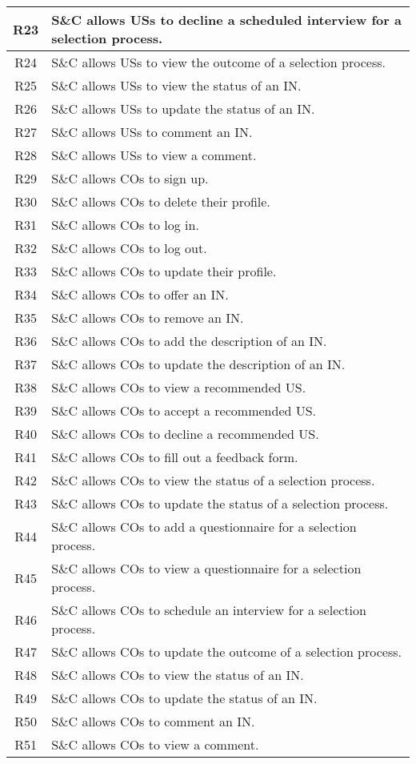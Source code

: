 \begin{longtable}{|c|p{10.5cm}|}
    R23 & S\&C allows USs to decline a scheduled interview for a selection process. \\ \hline
    R24 & S\&C allows USs to view the outcome of a selection process. \\ \hline
    R25 & S\&C allows USs to view the status of an IN. \\ \hline
    R26 & S\&C allows USs to update the status of an IN. \\ \hline
    R27 & S\&C allows USs to comment an IN. \\ \hline
    R28 & S\&C allows USs to view a comment. \\ \hline

    R29 & S\&C allows COs to sign up. \\ \hline
    R30 & S\&C allows COs to delete their profile. \\ \hline
    R31 & S\&C allows COs to log in. \\ \hline
    R32 & S\&C allows COs to log out. \\ \hline
    R33 & S\&C allows COs to update their profile. \\ \hline
    R34 & S\&C allows COs to offer an IN. \\ \hline
    R35 & S\&C allows COs to remove an IN. \\ \hline
    R36 & S\&C allows COs to add the description of an IN. \\ \hline
    R37 & S\&C allows COs to update the description of an IN. \\ \hline
    R38 & S\&C allows COs to view a recommended US. \\ \hline
    R39 & S\&C allows COs to accept a recommended US. \\ \hline
    R40 & S\&C allows COs to decline a recommended US. \\ \hline
    R41 & S\&C allows COs to fill out a feedback form. \\ \hline
    R42 & S\&C allows COs to view the status of a selection process. \\ \hline
    R43 & S\&C allows COs to update the status of a selection process. \\ \hline
    R44 & S\&C allows COs to add a questionnaire for a selection process. \\ \hline
    R45 & S\&C allows COs to view a questionnaire for a selection process. \\ \hline
    R46 & S\&C allows COs to schedule an interview for a selection process. \\ \hline
    R47 & S\&C allows COs to update the outcome of a selection process. \\ \hline
    R48 & S\&C allows COs to view the status of an IN. \\ \hline
    R49 & S\&C allows COs to update the status of an IN. \\ \hline
    R50 & S\&C allows COs to comment an IN. \\ \hline
    R51 & S\&C allows COs to view a comment. \\ \hline
    

\end{longtable}
